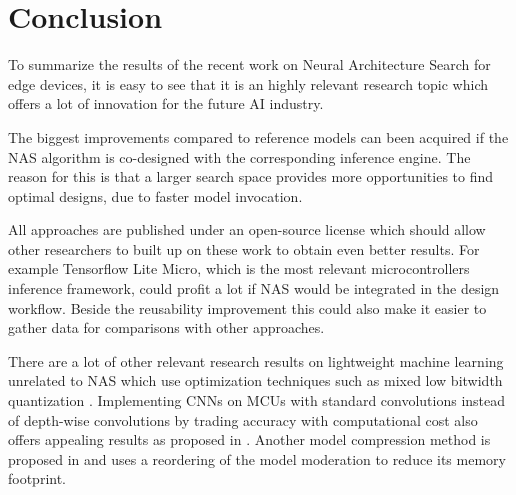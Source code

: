 \documentclass[10pt,        %
               a4paper,     %
               journal,     %
               ]{IEEEtran}
\begin{document}


\section{Conclusion}\label{sec:con}
To summarize the results of the recent work on Neural Architecture Search for edge devices, it is easy to see that it is an highly relevant research topic which offers a lot of innovation for the future AI industry. 

The biggest improvements compared to reference models can been acquired if the NAS algorithm is co-designed with the corresponding inference engine. The reason for this is that a larger search space provides more opportunities to find optimal designs, due to faster model invocation.

All approaches are published under an open-source license which should allow other researchers to built up on these work to obtain even better results. For example Tensorflow Lite Micro, which is the most relevant microcontrollers inference framework, could profit a lot if NAS would be integrated in the design workflow. Beside the reusability improvement this could also make it easier to gather data for comparisons with other approaches.

There are a lot of other relevant research results on lightweight machine learning unrelated to NAS which use optimization techniques such as mixed low bitwidth quantization \cite{memorydrivenquant2019}. Implementing CNNs on MCUs with standard convolutions instead of depth-wise convolutions by trading accuracy with computational cost also offers appealing results as proposed in \cite{mixedquant2020}. Another model compression method is proposed in \cite{opreordering2019} and uses a reordering of the model moderation to reduce its memory footprint.

\end{document}
